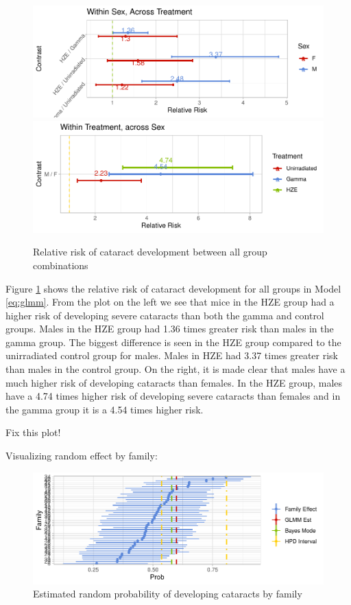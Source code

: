 \documentclass[12pt]{article}
\begin{document}
\begin{figure}[H]

{\centering \includegraphics[width=0.5\linewidth]{bookdown_report_files/figure-latex/RR-1} \includegraphics[width=0.5\linewidth]{bookdown_report_files/figure-latex/RR-2} 

}

\caption{Relative risk of cataract development between all group combinations}\label{fig:RR}
\end{figure}

Figure \ref{fig:RR} shows the relative risk of cataract development for all groups in Model \eqref{eq:glmm}. From the plot on the left we see that mice in the HZE group had a higher risk of developing severe cataracts than both the gamma and control groups. Males in the HZE group had 1.36 times greater risk than males in the gamma group. The biggest difference is seen in the HZE group compared to the unirradiated control group for males. Males in HZE had 3.37 times greater risk than males in the control group. On the right, it is made clear that males have a much higher risk of developing cataracts than females. In the HZE group, males have a 4.74 times higher risk of developing severe cataracts than females and in the gamma group it is a 4.54 times higher risk.

Fix this plot!

Visualizing random effect by family:\\

\begin{figure}[H]

{\centering \includegraphics{bookdown_report_files/figure-latex/re-1} 

}

\caption{Estimated random probability of developing cataracts by family}\label{fig:re}
\end{figure}
\end{document}
